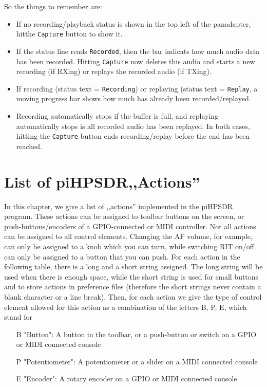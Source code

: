 \documentclass[12pt]{book}
\def\rett#1{\texttt{\color{red}#1}}
\def\bltt#1{\texttt{\color{blue}#1}}
\def\pH{pi\-HPSDR\xspace}
\begin{document}
So the things to remember are:
\begin{itemize}
\item{If no recording/playback status is shown in the top left of the panadapter, hitthe  \bltt{Capture} button
to show it.}
\item{If the status line reads \rett{Recorded}, then the bar indicats how much audio data has been recorded. Hitting
\bltt{Capture} now deletes this audio and starts a new recording (if RXing) or replays the recorded audio
(if TXing).}
\item{If recording (status text = \rett{Recording}) or replaying (status text = \rett{Replay}, a moving progress
bar shows how much has already been recorded/replayed.}
\item{Recording automatically stops if the buffer is full, and replaying automatically stops is all recorded audio
has been replayed. In both cases, hitting the \bltt{Capture} button ends recording/replay before the end has been reached.}
\end{itemize}


\appendix
\chapter{List of \pH ,,Actions''}
\label{sec:actionlist}

In this chapter, we give a list of ,,actions'' implemented in the \pH program. These actions can be
assigned to toolbar buttons on the screen, or push-buttons/encoders of a GPIO-connected or MIDI controller.
Not all actions can be assigned to all control elements. Changing the AF volume, for example, can only be
assigned to a knob
which you can turn, while switching RIT on/off can only be assigned to a button that you can push. For each
action in the following table, there is a long and a short string assigned. The long string will be used
when there is enough space, while the short string is used for small buttons and to store actions in
preference files (therefore the short strings never contain a blank character or a line break). Then, for
each action we give the type of control element allowed for this action as a combination of the letters B,
P, E, which stand for

\begin{itemize}[font=\texttt, left=0pt]
\item[B] {"Button": A button in the toolbar, or a push-button or switch on a GPIO or MIDI connected console}
\item[P] {"Potentiometer": A potentiometer or a slider on a MIDI connected console}
\item[E] {"Encoder": A rotary encoder on a GPIO or MIDI connected console}
\end{itemize}
\end{document}
